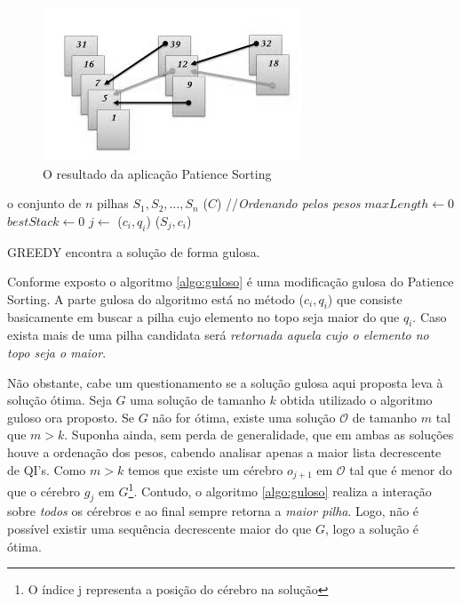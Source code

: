\documentclass[12pt]{article}
\begin{document}
\begin{figure}[ht]
\centering
\includegraphics[width=.5\textwidth]{patiente_sort.jpg}
\caption{O resultado da aplicação Patience Sorting}
\label{fig:patiente_sort}
\end{figure}


\begin{algorithm}
\DontPrintSemicolon %

\INITIALIZE o conjunto de $n$ pilhas ${S_1,S_2,\ldots,S_n}$\;
\SORT($C$) {//\textit{Ordenando pelos pesos}}\;
$maxLength \gets 0$\;
$bestStack \gets 0$\;
 {
   $j \gets $ \GREEDYCHOICE($c_i,q_i$)\;
   \PUSH($S_j,c_i$)\;
}
\;
\caption{\sc GREEDY encontra a solução de forma gulosa.}
\label{algo:guloso}
\end{algorithm}

Conforme exposto o algoritmo \ref{algo:guloso} é uma modificação gulosa do Patience Sorting. A parte gulosa do algoritmo está no método \textsc{\GREEDYCHOICE($c_i,q_i$)} que consiste basicamente em buscar a pilha cujo elemento no topo seja maior do que $q_i$. Caso exista mais de uma pilha candidata será \textit{retornada aquela cujo o elemento no topo seja o maior}.

Não obstante, cabe um questionamento se a solução gulosa aqui proposta leva à solução ótima. Seja $G$ uma solução de tamanho $k$ obtida utilizado o algoritmo guloso ora proposto. Se $G$ não for ótima, existe uma solução $\mathcal{O}$ de tamanho $m$ tal que $m > k${}. Suponha ainda, sem perda de generalidade, que em ambas as soluções houve a ordenação dos pesos, cabendo analisar apenas a maior lista decrescente de QI's. Como $m > k$ temos que existe um cérebro $o_{j+1}$ em $\mathcal{O}$ tal que é menor do que o cérebro $g_{j}$ em $G$\footnote{O índice j representa a posição do cérebro na solução}. Contudo, o algoritmo \ref{algo:guloso} realiza a interação sobre \textit{todos} os cérebros e ao final sempre retorna a \textit{maior pilha}{}. Logo, não é possível existir uma sequência decrescente maior do que $G$, logo a solução é ótima.
\end{document}
